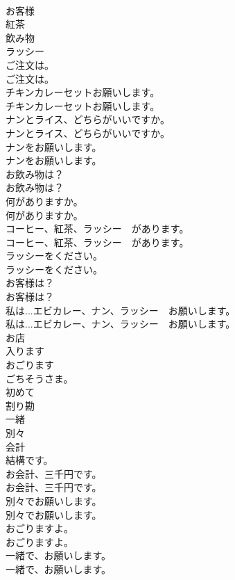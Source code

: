 \documentclass[8pt]{extreport}
\begin{document}
\begin{CJK}{UTF8}{min}
\\	お客様
\\	紅茶
\\	飲み物
\\	ラッシー
\\	ご注文は。	
\\	ご注文は。 
\\	チキンカレーセットお願いします。	
\\	チキンカレーセットお願いします。 
\\	ナンとライス、どちらがいいですか。	
\\	ナンとライス、どちらがいいですか。 
\\	ナンをお願いします。	
\\	ナンをお願いします。 
\\	お飲み物は？	
\\	お飲み物は？ 
\\	何がありますか。	
\\	何がありますか。 
\\	コーヒー、紅茶、ラッシー　があります。	
\\	コーヒー、紅茶、ラッシー　があります。 
\\	ラッシーをください。	
\\	ラッシーをください。 
\\	お客様は？	
\\	お客様は？ 
\\	私は...エビカレー、ナン、ラッシー　お願いします。	
\\	私は...エビカレー、ナン、ラッシー　お願いします。 
\\	お店
\\	入ります
\\	おごります
\\	ごちそうさま。
\\	初めて
\\	割り勘
\\	一緒
\\	別々
\\	会計
\\	結構です。
\\	お会計、三千円です。	
\\	お会計、三千円です。 
\\	別々でお願いします。	
\\	別々でお願いします。 
\\	おごりますよ。	
\\	おごりますよ。 
\\	一緒で、お願いします。	
\\	一緒で、お願いします。 

\end{CJK}
\end{document}
